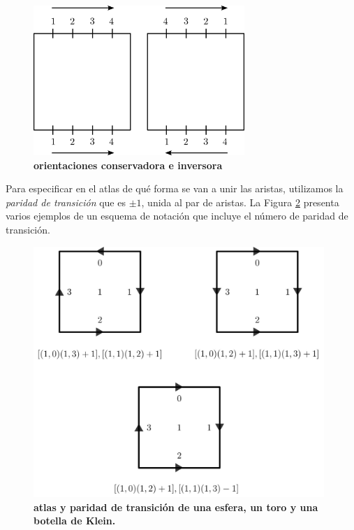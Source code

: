 \begin{figure}[h]
\includegraphics[width=8cm]{Img/GEO/geo-atlas1.jpg}
\centering
\caption{\textbf{\footnotesize{orientaciones conservadora e inversora}}}
\label{fig:atlas0}
\end{figure}

Para especificar en el atlas de qué forma se van a unir las aristas, utilizamos la \textit{paridad de transición} que es $\pm 1$, unida al par de aristas. La Figura \ref{fig:atlas1} presenta varios ejemplos de un esquema de notación que incluye el número de paridad de transición.

\begin{figure}[h]
\includegraphics[width=11cm]{Img/GEO/geo-atlas2.jpg}
\centering
\caption{\textbf{\footnotesize{atlas y paridad de transición de una esfera, un toro y una botella de Klein.}}}
\label{fig:atlas1}
\end{figure}


